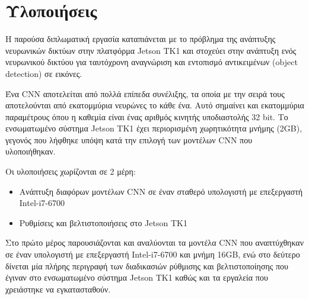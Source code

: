 \chapter{Υλοποιήσεις}
\label{chapter:implementations}

Η παρούσα διπλωματική εργασία καταπιάνεται με το
πρόβλημα της ανάπτυξης νευρωνικών δικτύων στην πλατφόρμα Jetson TK1
και στοχεύει στην ανάπτυξη ενός νευρωνικού δικτύου για ταυτόχρονη
αναγνώριση και εντοπισμό αντικειμένων (object detection) σε εικόνες.

Ένα CNN αποτελείται από πολλά επίπεδα συνέλιξης, τα οποία με την σειρά τους
αποτελούνται από εκατομμύρια νευρώνες το κάθε ένα. Αυτό σημαίνει και εκατομμύρια
παραμέτρους όπου η καθεμία είναι ένας αριθμός κινητής υποδιαστολής 32 bit.
Το ενσωματωμένο σύστημα Jetson TK1 έχει περιορισμένη χωρητικότητα μνήμης (2GB),
γεγονός που λήφθηκε υπόψη κατά την επιλογή των μοντέλων CNN που υλοποιήθηκαν.

Οι υλοποιήσεις χωρίζονται σε 2 μέρη:
\begin{itemize}
  \item{Ανάπτυξη διαφόρων μοντέλων CNN σε έναν σταθερό υπολογιστή με επεξεργαστή Intel-i7-6700}
  \item{Ρυθμίσεις και βελτιστοποιήσεις στο Jetson TK1}
\end{itemize}

Στο πρώτο μέρος παρουσιάζονται και αναλύονται τα μοντέλα CNN που αναπτύχθηκαν
σε έναν υπολογιστή με επεξεργαστή Intel-i7-6700 και μνήμη 16GB, ενώ στο
δεύτερο δίνεται μία πλήρης περιγραφή των διαδικασιών ρύθμισης και βελτιστοποίησης που έγιναν
στο ενσωματωμένο σύστημα Jetson TK1 καθώς και τα εργαλεία που χρειάστηκε να εγκατασταθούν.





